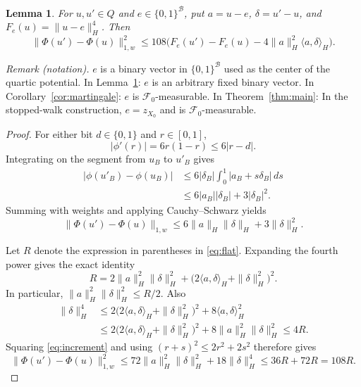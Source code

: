 \documentclass[11pt]{article}
\newtheorem{lemma}[theorem]{Lemma}
\theoremstyle{definition}
\theoremstyle{remark}
\numberwithin{equation}{section}
\newcommand{\calF}{\mathcal F}
\begin{document}
\begin{lemma}\label{lem:flat}
For $u,u'\in Q$ and $e\in\{0,1\}^{\mathcal B}$, put
$a=u-e$, $\delta=u'-u$, and $F_e(u)=\|u-e\|_H^4$. Then
\begin{equation}\label{eq:flat}
 \|\Phi(u')-\Phi(u)\|_{1,w}^2
 \leq108\bigl(F_e(u')-F_e(u)
                   -4\|a\|_H^2\langle a,\delta\rangle_H\bigr).
\end{equation}
\end{lemma}

\noindent\textit{Remark (notation).} $e$ is a binary vector in $\{0,1\}^{\mathcal B}$ used as the center of the quartic potential. In Lemma~\ref{lem:flat}: $e$ is an arbitrary fixed binary vector. In Corollary~\ref{cor:martingale}: $e$ is $\calF_0$-measurable. In Theorem~\ref{thm:main}: In the stopped-walk construction, $e=z_{X_0}$ and is $\calF_0$-measurable.


\begin{proof}
For either bit $d\in\{0,1\}$ and $r\in[0,1]$,
\[
 |\phi'(r)|=6r(1-r)\leq6|r-d|.
\]
Integrating on the segment from $u_B$ to $u'_B$ gives
\begin{align*}
 |\phi(u'_B)-\phi(u_B)|
 &\leq6|\delta_B|\int_0^1|a_B+s\delta_B|\,ds\\
 &\leq6|a_B||\delta_B|+3|\delta_B|^2.
\end{align*}
Summing with weights and applying Cauchy--Schwarz yields
\begin{equation}\label{eq:increment}
 \|\Phi(u')-\Phi(u)\|_{1,w}
 \leq6\|a\|_H\|\delta\|_H+3\|\delta\|_H^2.
\end{equation}

Let $R$ denote the expression in parentheses in \eqref{eq:flat}.
Expanding the fourth power gives the exact identity
\begin{equation}\label{eq:remainder}
 R=2\|a\|_H^2\|\delta\|_H^2
        +\bigl(2\langle a,\delta\rangle_H+\|\delta\|_H^2\bigr)^2.
\end{equation}
In particular, $\|a\|_H^2\|\delta\|_H^2\leq R/2$. Also
\begin{align*}
 \|\delta\|_H^4
 &\leq2\bigl(2\langle a,\delta\rangle_H+\|\delta\|_H^2\bigr)^2
              +8\langle a,\delta\rangle_H^2\\
 &\leq2\bigl(2\langle a,\delta\rangle_H+\|\delta\|_H^2\bigr)^2
              +8\|a\|_H^2\|\delta\|_H^2
 \leq4R.
\end{align*}
Squaring \eqref{eq:increment} and using $(r+s)^2\leq2r^2+2s^2$
therefore gives
\[
 \|\Phi(u')-\Phi(u)\|_{1,w}^2
 \leq72\|a\|_H^2\|\delta\|_H^2+18\|\delta\|_H^4
 \leq36R+72R=108R.
\]
\end{proof}
\end{document}
